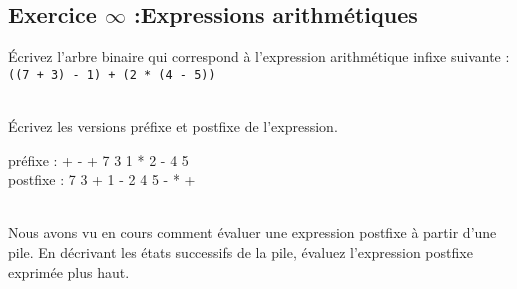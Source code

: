 \documentclass[iutinfo, a4paper, nocorrections, 10pt]{ustl-tdtp}
\date{\annee{2018}--\annee{2019}}
\begin{document}
\maketitle
\thispagestyle{empty}



\subsection*{Exercice $\infty$ :Expressions arithmétiques}


\question Écrivez l'arbre binaire qui correspond à l'expression arithmétique infixe suivante : \\
\texttt{((7 + 3) - 1) + (2 * (4 - 5))}


\begin{solution}
{\color{red}

}
\end{solution}

~\\ \question Écrivez les versions préfixe et postfixe de l'expression.

\begin{solution}
{\color{red}
préfixe : + - + 7 3 1 * 2 - 4 5  \\
postfixe : 7 3 + 1 - 2 4 5 - * +

}
\end{solution}

~\\ \question Nous avons vu en cours comment évaluer une expression postfixe à partir d'une pile. En décrivant les états successifs de la pile, évaluez l'expression postfixe exprimée plus haut.
\end{document}
